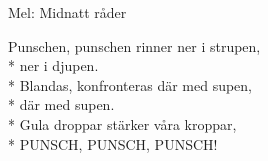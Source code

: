 \begin{SongText}
    \begin{SongInfo}
        Mel: Midnatt råder
    \end{SongInfo}
    \begin{SongVerse}
        Punschen, punschen rinner ner i strupen,\\*%
        ner i djupen.\\*%
        Blandas, konfronteras där med supen,\\*%
        där med supen.\\*%
        Gula droppar stärker våra kroppar,\\*%
        PUNSCH, PUNSCH, PUNSCH!
    \end{SongVerse}
\end{SongText}
